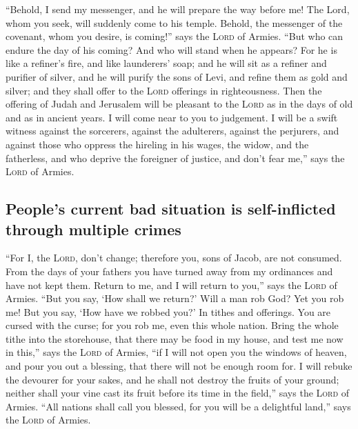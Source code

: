  ``Behold, I send my messenger, and he will prepare the
way before me! The Lord, whom you seek, will suddenly come to his
temple. Behold, the messenger of the covenant, whom you desire, is
coming!'' says the \textsc{Lord} of Armies.  ``But who can
endure the day of his coming? And who will stand when he appears? For he
is like a refiner's fire, and like launderers' soap;  and
he will sit as a refiner and purifier of silver, and he will purify the
sons of Levi, and refine them as gold and silver; and they shall offer
to the \textsc{Lord} offerings in righteousness.  Then the
offering of Judah and Jerusalem will be pleasant to the \textsc{Lord} as
in the days of old and as in ancient years.  I will come
near to you to judgement. I will be a swift witness against the
sorcerers, against the adulterers, against the perjurers, and against
those who oppress the hireling in his wages, the widow, and the
fatherless, and who deprive the foreigner of justice, and don't fear
me,'' says the \textsc{Lord} of Armies.

\hypertarget{peoples-current-bad-situation-is-self-inflicted-through-multiple-crimes}{%
\subsection{People's current bad situation is self-inflicted through
multiple
crimes}\label{peoples-current-bad-situation-is-self-inflicted-through-multiple-crimes}}

 ``For I, the \textsc{Lord}, don't change; therefore you,
sons of Jacob, are not consumed.  From the days of your
fathers you have turned away from my ordinances and have not kept them.
Return to me, and I will return to you,'' says the \textsc{Lord} of
Armies. ``But you say, `How shall we return?'  Will a man
rob God? Yet you rob me! But you say, `How have we robbed you?' In
tithes and offerings.  You are cursed with the curse; for
you rob me, even this whole nation.  Bring the whole
tithe into the storehouse, that there may be food in my house, and test
me now in this,'' says the \textsc{Lord} of Armies, ``if I will not open
you the windows of heaven, and pour you out a blessing, that there will
not be enough room for.  I will rebuke the devourer for
your sakes, and he shall not destroy the fruits of your ground; neither
shall your vine cast its fruit before its time in the field,'' says the
\textsc{Lord} of Armies.  ``All nations shall call you
blessed, for you will be a delightful land,'' says the \textsc{Lord} of
Armies.

